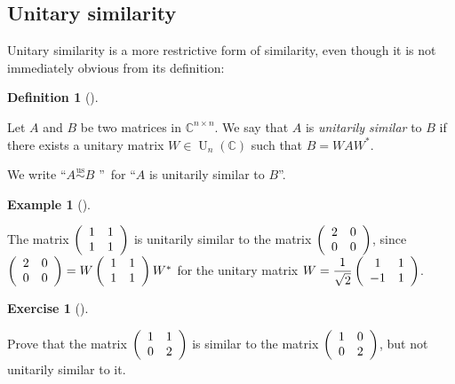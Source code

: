 \documentclass[numbers=enddot,12pt,final,onecolumn,notitlepage]{scrartcl}%
\newcounter{exer}
\numberwithin{exer}{subsection}
\theoremstyle{definition}
\newtheorem{defi}[theo]{Definition}
\newenvironment{definition}[1][]
{\begin{defi}[#1]\begin{leftbar}}
{\end{leftbar}\end{defi}}
\newtheorem{exam}[theo]{Example}
\newenvironment{example}[1][]
{\begin{exam}[#1]\begin{leftbar}}
{\end{leftbar}\end{exam}}
\newtheorem{exmp}[exer]{Exercise}
\newenvironment{exercise}[1][]
{\begin{exmp}[#1]\begin{leftbar}}
{\end{leftbar}\end{exmp}}
\begin{document}
\subsection{Unitary similarity}

Unitary similarity is a more restrictive form of similarity, even though it is
not immediately obvious from its definition:

\begin{definition}
\label{def.schurtri.unisim.def}Let $A$ and $B$ be two matrices in
$\mathbb{C}^{n\times n}$. We say that $A$ is \emph{unitarily similar} to $B$
if there exists a unitary matrix $W\in\operatorname*{U}\nolimits_{n}\left(
\mathbb{C}\right)  $ such that $B=WAW^{\ast}$.

We write \textquotedblleft$A\overset{\operatorname*{us}}{\sim}B$%
\textquotedblright\ for \textquotedblleft$A$ is unitarily similar to
$B$\textquotedblright.
\end{definition}

\begin{example}
The matrix $\left(
\begin{array}
[c]{cc}%
1 & 1\\
1 & 1
\end{array}
\right)  $ is unitarily similar to the matrix $\left(
\begin{array}
[c]{cc}%
2 & 0\\
0 & 0
\end{array}
\right)  $, since $\left(
\begin{array}
[c]{cc}%
2 & 0\\
0 & 0
\end{array}
\right)  =W\left(
\begin{array}
[c]{cc}%
1 & 1\\
1 & 1
\end{array}
\right)  W^{\ast}$ for the unitary matrix $W=\dfrac{1}{\sqrt{2}}\left(
\begin{array}
[c]{cc}%
1 & 1\\
-1 & 1
\end{array}
\right)  $.
\end{example}

\begin{exercise}
\label{exe.schurtri.unisim.two2x2} Prove that the matrix $\left(
\begin{array}
[c]{cc}%
1 & 1\\
0 & 2
\end{array}
\right)  $ is similar to the matrix $\left(
\begin{array}
[c]{cc}%
1 & 0\\
0 & 2
\end{array}
\right)  $, but not unitarily similar to it.
\end{exercise}
\end{document}

